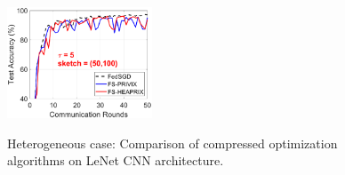 \documentclass[twoside]{article}
\begin{document}
\begin{figure}[H]
\begin{center}
{		\includegraphics[width=1.7in]{MNIST_figures/local5_sketch50_iid0_test_acc.eps}
		}
	\end{center}
	\caption{Heterogeneous case: Comparison of compressed optimization algorithms on LeNet CNN architecture.}
    \label{fig:MNIST-iid0-app}
\end{figure}
\end{document}
